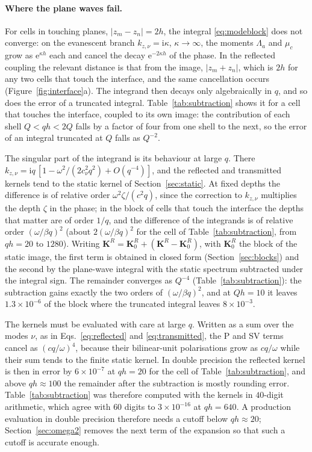 \documentclass[11pt,a4paper]{article}
\newcommand{\bK}{\mathbf{K}}
\newcommand{\ii}{\mathrm{i}}
\newcommand{\ee}{\mathrm{e}}
\begin{document}
\paragraph{Where the plane waves fail.} For cells in touching planes, $|z_m-z_n|=2h$, the integral
\eqref{eq:modeblock} does not converge: on the evanescent branch $k_{z,\nu}=\ii\kappa$, $\kappa\to\infty$, the
moments $\Lambda_a$ and $\mu_c$ grow as $\ee^{\kappa h}$ each and cancel the decay $\ee^{-2\kappa h}$ of the
phase. In the reflected coupling the relevant distance is that from the image, $|z_m+z_n|$, which is $2h$
for any two cells that touch the interface, and the same cancellation occurs (Figure~\ref{fig:interface}a).
The integrand then decays only algebraically in $q$, and so does the error of a truncated integral.
Table~\ref{tab:subtraction} shows it for a cell that touches the interface, coupled to its own image: the
contribution of each shell $Q<qh<2Q$ falls by a factor of four from one shell to the next, so the error of an
integral truncated at $Q$ falls as $Q^{-2}$.

The singular part of the integrand is its behaviour at large $q$. There $k_{z,\nu}=\ii q\,[1-\omega^2/(2c_\nu^2q^2)
+O(q^{-4})]$, and the reflected and transmitted kernels tend to the static kernel of Section~\ref{sec:static}.
At fixed depths the difference is of relative order $\omega^2\zeta/(c^2q)$, since the correction to $k_{z,\nu}$
multiplies the depth $\zeta$ in the phase; in the block of cells that touch the interface the depths that
matter are of order $1/q$, and the difference of the integrands is of relative order $(\omega/\beta q)^2$
(about $2(\omega/\beta q)^2$ for the cell of Table~\ref{tab:subtraction}, from $qh=20$ to $1280$). Writing
$\bK^{R}=\bK^{R}_0+(\bK^{R}-\bK^{R}_0)$, with $\bK^{R}_0$ the block of the static image, the first term is obtained
in closed form (Section~\ref{sec:blocks}) and the second by the plane-wave integral with the static spectrum
subtracted under the integral sign. The remainder converges as $Q^{-4}$ (Table~\ref{tab:subtraction}): the
subtraction gains exactly the two orders of $(\omega/\beta q)^2$, and at $Qh=10$ it leaves $1.3\times10^{-6}$ of the
block where the truncated integral leaves $8\times10^{-3}$.

The kernels must be evaluated with care at large $q$. Written as a sum over the modes $\nu$, as in
Eqs.~\eqref{eq:reflected} and \eqref{eq:transmitted}, the P and SV terms cancel as $(cq/\omega)^4$, because their
bilinear-unit polarisations grow as $cq/\omega$ while their sum tends to the finite static kernel. In double
precision the reflected kernel is then in error by $6\times10^{-7}$ at $qh=20$ for the cell of
Table~\ref{tab:subtraction}, and above $qh\approx100$ the remainder after the subtraction is mostly rounding
error. Table~\ref{tab:subtraction} was therefore computed with the kernels in $40$-digit arithmetic, which agree
with $60$ digits to $3\times10^{-16}$ at $qh=640$. A production evaluation in double precision therefore needs a cutoff below
$qh\approx20$; Section~\ref{sec:omega2} removes the next term of the expansion so that such a cutoff is
accurate enough.
\end{document}
